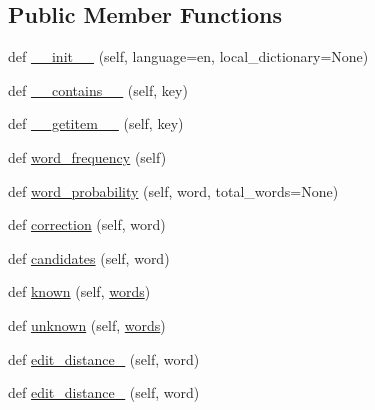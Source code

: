 \subsection*{Public Member Functions}
\begin{DoxyCompactItemize}
\item 
def \mbox{\hyperlink{classcapstoneproject_1_1content__rating_1_1spelling__correction_1_1spellchecker_1_1_spell_checker_a6ec738f704c42932bedb9d09be9392dc}{\+\_\+\+\_\+init\+\_\+\+\_\+}} (self, language=\textquotesingle{}en\textquotesingle{}, local\+\_\+dictionary=None)
\item 
def \mbox{\hyperlink{classcapstoneproject_1_1content__rating_1_1spelling__correction_1_1spellchecker_1_1_spell_checker_ae287b020e8ecf3dffe0c05ad2db51937}{\+\_\+\+\_\+contains\+\_\+\+\_\+}} (self, key)
\item 
def \mbox{\hyperlink{classcapstoneproject_1_1content__rating_1_1spelling__correction_1_1spellchecker_1_1_spell_checker_adb5b222940adf8f86d931735144577b5}{\+\_\+\+\_\+getitem\+\_\+\+\_\+}} (self, key)
\item 
def \mbox{\hyperlink{classcapstoneproject_1_1content__rating_1_1spelling__correction_1_1spellchecker_1_1_spell_checker_a7365ff0037585d9ebd00eadae513e96a}{word\+\_\+frequency}} (self)
\item 
def \mbox{\hyperlink{classcapstoneproject_1_1content__rating_1_1spelling__correction_1_1spellchecker_1_1_spell_checker_a7a2a7289252188ae289e4cd9f46d6b25}{word\+\_\+probability}} (self, word, total\+\_\+words=None)
\item 
def \mbox{\hyperlink{classcapstoneproject_1_1content__rating_1_1spelling__correction_1_1spellchecker_1_1_spell_checker_a4e7085f88c7caf33686e956c14fb435a}{correction}} (self, word)
\item 
def \mbox{\hyperlink{classcapstoneproject_1_1content__rating_1_1spelling__correction_1_1spellchecker_1_1_spell_checker_a82729e9d8e408975c17a24832e7fc81c}{candidates}} (self, word)
\item 
def \mbox{\hyperlink{classcapstoneproject_1_1content__rating_1_1spelling__correction_1_1spellchecker_1_1_spell_checker_ac2a86129d68d74a40fe7f76960320cff}{known}} (self, \mbox{\hyperlink{namespacecapstoneproject_1_1content__rating_1_1spelling__correction_1_1spellchecker_a4ab1d9ccddc3e0703cea49bc4b51df88}{words}})
\item 
def \mbox{\hyperlink{classcapstoneproject_1_1content__rating_1_1spelling__correction_1_1spellchecker_1_1_spell_checker_a431c13f3fa86a5c60ad715e3f910f4c4}{unknown}} (self, \mbox{\hyperlink{namespacecapstoneproject_1_1content__rating_1_1spelling__correction_1_1spellchecker_a4ab1d9ccddc3e0703cea49bc4b51df88}{words}})
\item 
def \mbox{\hyperlink{classcapstoneproject_1_1content__rating_1_1spelling__correction_1_1spellchecker_1_1_spell_checker_a4b066ee1bc74ebd8008513db4032da7d}{edit\+\_\+distance\+\_}} (self, word)
\item 
def \mbox{\hyperlink{classcapstoneproject_1_1content__rating_1_1spelling__correction_1_1spellchecker_1_1_spell_checker_ab7f996fc76aae3a1d9de0fcf07e2864b}{edit\+\_\+distance\+\_}} (self, word)
\end{DoxyCompactItemize}


